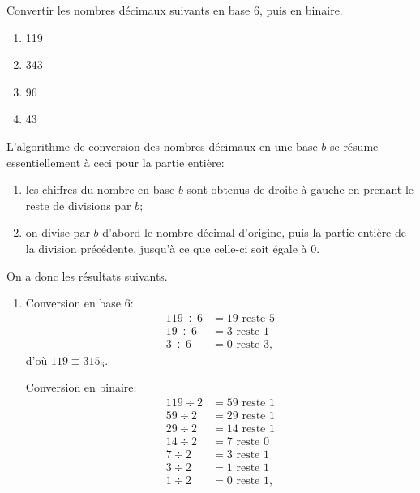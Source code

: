 \begin{exercice}
  Convertir les nombres décimaux suivants en base 6, puis en binaire.
  \begin{enumerate}
  \item 119
  \item 343
  \item 96
  \item 43
  \end{enumerate}
  \begin{sol}
    L'algorithme de conversion des nombres décimaux en une base $b$ se
    résume essentiellement à ceci pour la partie entière:
    \begin{enumerate}[1.]
    \item les chiffres du nombre en base $b$ sont obtenus de droite à
      gauche en prenant le reste de divisions par $b$;
    \item on divise par $b$ d'abord le nombre décimal d'origine, puis
      la partie entière de la division précédente, jusqu'à ce que
      celle-ci soit égale à 0.
    \end{enumerate}
    On a donc les résultats suivants.
    \begin{enumerate}
    \item
      \begin{minipage}[t]{0.48\linewidth}
        Conversion en base 6:
        \begin{align*}
          119 \div 6 &= 19 \text{ reste } 5 \\
           19 \div 6 &= 3 \text{ reste } 1 \\
            3 \div 6 &= 0 \text{ reste } 3,
        \end{align*}
        d'où $119 \equiv 315_6$.
      \end{minipage}
      \hfill
      \begin{minipage}[t]{0.48\linewidth}
        Conversion en binaire:
        \begin{align*}
          119 \div 2 &= 59 \text{ reste } 1 \\
           59 \div 2 &= 29 \text{ reste } 1 \\
           29 \div 2 &= 14 \text{ reste } 1 \\
           14 \div 2 &= 7 \text{ reste } 0 \\
            7 \div 2 &= 3 \text{ reste } 1 \\
            3 \div 2 &= 1 \text{ reste } 1 \\
            1 \div 2 &= 0 \text{ reste } 1,
        \end{align*}

\end{minipage}
\end{enumerate}
\end{sol}
\end{exercice}

